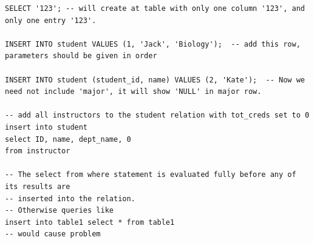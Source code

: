 \documentclass[8pt, a4paper, oneside, twocolumn]{extarticle}
\begin{document}
\begin{verbatim}
SELECT '123'; -- will create at table with only one column '123', and only one entry '123'.

INSERT INTO student VALUES (1, 'Jack', 'Biology');  -- add this row, parameters should be given in order

INSERT INTO student (student_id, name) VALUES (2, 'Kate');  -- Now we need not include 'major', it will show 'NULL' in major row.

-- add all instructors to the student relation with tot_creds set to 0
insert into student
select ID, name, dept_name, 0
from instructor

-- The select from where statement is evaluated fully before any of its results are
-- inserted into the relation.
-- Otherwise queries like
insert into table1 select * from table1
-- would cause problem
\end{verbatim}
\end{document}
